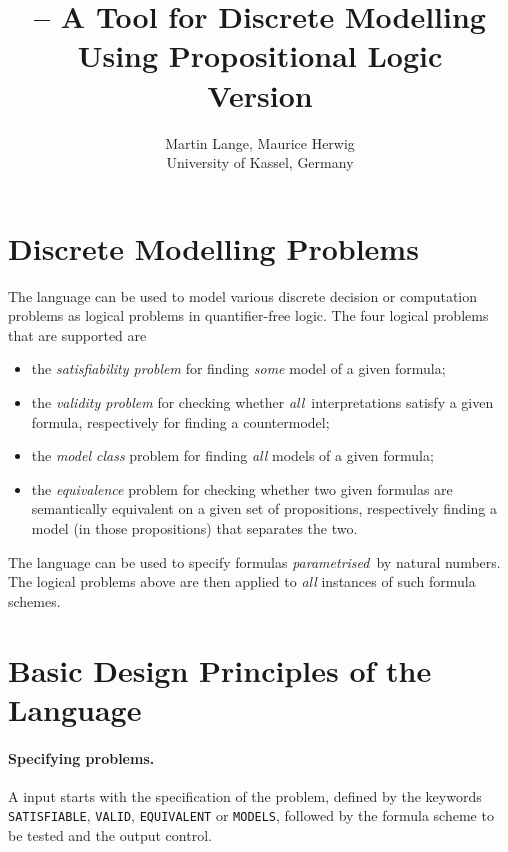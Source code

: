 \documentclass[twoside]{article}
\title{\DiMo -- A Tool for Discrete Modelling Using Propositional Logic \\ Version \DiMoVersion}
\author{Martin Lange, Maurice Herwig \\ University of Kassel, Germany}
\begin{document}
\maketitle

\tableofcontents

\section{Discrete Modelling Problems}

The \DiMo language can be used to model various discrete decision or computation problems as logical problems in quantifier-free logic.
The four logical problems that are supported are
\begin{itemize}
\item the \emph{satisfiability problem} for finding \emph{some} model of a given formula;
\item the \emph{validity problem} for checking whether \emph{all} interpretations satisfy a given formula, respectively for finding
      a countermodel;
\item the \emph{model class} problem for finding \emph{all} models of a given formula;
\item the \emph{equivalence} problem for checking whether two given formulas are semantically equivalent on a given set of propositions, 
      respectively finding a model (in those propositions) that separates the two.
\end{itemize}
The \DiMo language can be used to specify formulas \emph{parametrised} by natural numbers. The logical problems above are then applied
to \emph{all} instances of such formula schemes. 


\section{Basic Design Principles of the Language}

\paragraph*{Specifying problems.} 
A \DiMo input starts with the specification of the problem, defined by the keywords \texttt{SATISFIABLE}, \texttt{VALID}, 
\texttt{EQUIVALENT} or \texttt{MODELS}, followed by the formula scheme to be tested and the output control. 
\end{document}
